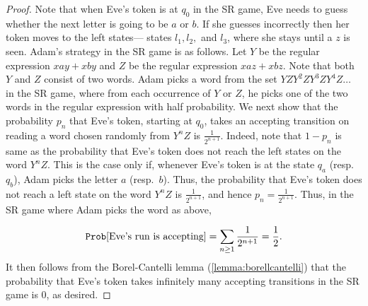 \begin{proof}
    Note that when Eve's token is at $q_0$ in the SR game, Eve needs to guess whether the next letter is going to be $a$ or $b$. If she guesses incorrectly then her token moves to the left states--- states $l_1,l_2,$ and $l_3$, where she stays until a $z$ is seen. Adam's strategy in the SR game is as follows. Let $Y$ be the regular expression $xay+xby$ and $Z$ be the regular expression $xaz+xbz$. Note that both $Y$ and $Z$ consist of two words. Adam picks a word from the set $YZY^2ZY^3ZY^4Z \dots$ in the SR game, where from each occurrence of $Y$ or $Z$, he picks one of the two words in the regular expression with half probability. We next show that the probability $p_n$ that Eve's token, starting at $q_0$, takes an accepting transition on reading a word chosen randomly from $Y^{n}Z$ is $\frac{1}{2^{n+1}}$. Indeed, note that $1-p_n$ is same as the probability that Eve's token does not reach the left states on the word $Y^n Z$. This is the case only if, whenever Eve's token is at the state $q_a$ (resp.\ $q_b$), Adam picks the letter $a$ (resp.\ $b$). Thus, the probability that Eve's token does not reach a left state on the word $Y^n Z$ is $\frac{1}{2^{n+1}}$, and hence $p_n=\frac{1}{2^{n+1}}$. Thus, in the SR game where Adam picks the word as above,

  $$
         \mathtt{Prob}[\text{Eve's run is accepting}] = \sum_{n\geq 1} \frac{1}{2^{n+1}} = \frac{1}{2}.
$$It then follows from the Borel-Cantelli lemma (\cref{lemma:borellcantelli}) that the probability that Eve's token takes infinitely many accepting transitions in the SR game is 0, as desired. 
\end{proof} 

